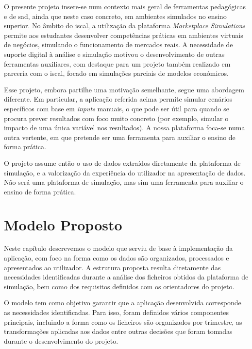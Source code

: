 O presente projeto insere-se num contexto mais geral de ferramentas pedagógicas e de \gls{sad}, ainda que neste caso concreto, em ambientes simulados no ensino superior. No âmbito do \gls{iscal}, a utilização da plataforma \textit{Marketplace Simulations} \cite{MarketplaceSim_2025} permite aos estudantes desenvolver competências práticas em ambientes virtuais de negócios, simulando o funcionamento de mercados reais. A necessidade de suporte digital à análise e simulação motivou o desenvolvimento de outras ferramentas auxiliares, com destaque para um projeto também realizado em parceria com o \gls{iscal}, focado em simulações parciais de modelos económicos.

Esse projeto, embora partilhe uma motivação semelhante, segue uma abordagem diferente. Em particular, a aplicação referida acima permite simular cenários específicos com base em \textit{inputs} manuais, o que pode ser útil para quando se procura prever resultados com foco muito concreto (por exemplo, simular o impacto de uma única variável nos resultados). A nossa plataforma foca-se numa outra vertente, em que pretende ser uma ferramenta para auxiliar o ensino de forma prática.

O projeto assume então o uso de dados extraídos diretamente da plataforma de simulação, e a valorização da experiência do utilizador na apresentação de dados. Não será uma plataforma de simulação, mas sim uma ferramenta para auxiliar o ensino de forma prática.

\chapter{Modelo Proposto}
\label{ch:modeloProposto}

Neste capítulo descrevemos o modelo que serviu de base à implementação da aplicação, com foco na forma como os dados são organizados, processados e apresentados ao utilizador. A estrutura proposta resulta diretamente das necessidades identificadas durante a análise dos ficheiros obtidos da plataforma de simulação, bem como dos requisitos definidos com os orientadores do projeto.

O modelo tem como objetivo garantir que a aplicação desenvolvida corresponde as necessidades identificadas. Para isso, foram definidos vários componentes principais, incluindo a forma como os ficheiros são organizados por trimestre, as transformações aplicadas aos dados entre outras decisões que foram tomadas durante o desenvolvimento do projeto.

